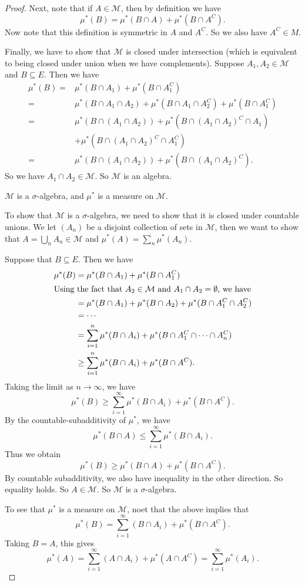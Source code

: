 \documentclass[a4paper]{article}
\begin{document}
\begin{proof}
  Next, note that if $A \in \mathcal{M}$, then by definition we have
  \[
    \mu^*(B) = \mu^*(B \cap A) + \mu^*(B \cap A^C).
  \]
  Now note that this definition is symmetric in $A$ and $A^C$. So we also have $A^C \in M$.

  Finally, we have to show that $\mathcal{M}$ is closed under intersection (which is equivalent to being closed under union when we have complements). Suppose $A_1, A_2 \in \mathcal{M}$ and $B \subseteq E$. Then we have
  \begin{align*}
    \mu^*(B) ={}& \mu^*(B \cap A_1) + \mu^*(B \cap A_1^C)\\
    ={}& \mu^*(B \cap A_1 \cap A_2) + \mu^*(B \cap A_1 \cap A_2^C) + \mu^*(B \cap A_1^C)\\
    ={}& \mu^*(B \cap (A_1 \cap A_2)) + \mu^*(B \cap (A_1\cap A_2)^C \cap A_1) \\
    &+ \mu^*(B \cap (A_1 \cap A_2)^C \cap A_1^C)\\
    ={}& \mu^*(B \cap (A_1 \cap A_2)) + \mu^*(B \cap (A_1 \cap A_2)^C).
  \end{align*}
  So we have $A_1 \cap A_2 \in \mathcal{M}$. So $\mathcal{M}$ is an algebra.
  \begin{claim}
    $\mathcal{M}$ is a $\sigma$-algebra, and $\mu^*$ is a measure on $\mathcal{M}$.
  \end{claim}
  To show that $\mathcal{M}$ is a $\sigma$-algebra, we need to show that it is closed under countable unions. We let $(A_n)$ be a disjoint collection of sets in $\mathcal{M}$, then we want to show that $A = \bigcup_n A_n \in \mathcal{M}$ and $\mu^*(A) = \sum_n \mu^*(A_n)$.

  Suppose that $B \subseteq E$. Then we have
  \begin{align*}
    \mu^*(B) &= \mu^*(B \cap A_1) + \mu^*(B \cap A_1^C)\\
    \intertext{Using the fact that $A_2 \in \mathcal{M}$ and $A_1 \cap A_2  =\emptyset$, we have}
    &= \mu^*(B \cap A_1) + \mu^*(B \cap A_2) + \mu^*(B \cap A_1^C \cap A_2^C)\\
    &= \cdots\\
    &= \sum_{i = 1}^n \mu^*(B\cap A_i) + \mu^*(B \cap A_1^C \cap \cdots \cap A_n^C)\\
    &\geq \sum_{i = 1}^n \mu^*(B \cap A_i) + \mu^*(B \cap A^C).
  \end{align*}
  Taking the limit as $n \to \infty$, we have
  \[
    \mu^*(B) \geq \sum_{i = 1}^\infty \mu^*(B \cap A_i) + \mu^*(B \cap A^C).
  \]
  By the countable-subadditivity of $\mu^*$, we have
  \[
    \mu^*(B \cap A) \leq \sum_{i = 1}^\infty \mu^*(B \cap A_i).
  \]
  Thus we obtain
  \[
    \mu^*(B) \geq \mu^*(B \cap A) + \mu^*(B \cap A^C).
  \]
  By countable subadditivity, we also have inequality in the other direction.  So equality holds. So $A \in \mathcal{M}$. So $\mathcal{M}$ is a $\sigma$-algebra.

  To see that $\mu^*$ is a measure on $\mathcal{M}$, noet that the above implies that
  \[
    \mu^*(B) = \sum_{i = 1}^\infty (B \cap A_i) + \mu^*(B \cap A^C).
  \]
  Taking $B = A$, this gives
  \[
    \mu^*(A) = \sum_{i = 1}^\infty (A \cap A_i) + \mu^*(A \cap A^C) = \sum_{i = 1}^\infty \mu^*(A_i).
  \]
\end{proof}
\end{document}
